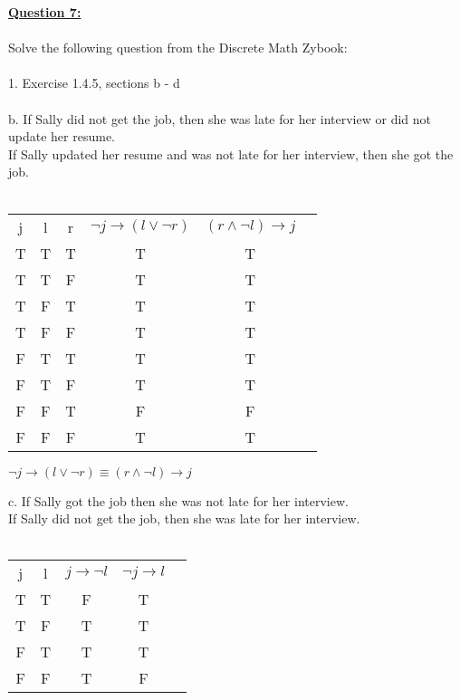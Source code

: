 \documentclass[11pt]{article}
\begin{document}
{\noindent \textbf{\ul{Question 7:}} \\
\\
Solve the following question from the Discrete Math Zybook:\\\\
1. Exercise 1.4.5, sections b - d \\\\
b. If Sally did not get the job, then she was late for her interview or did not update her resume.\\
If Sally updated her resume and was not late for her interview, then she got the job.\\\\

\begin{center}
 
\begin{tabular}{ |c|c|c|c|c|c| } 
 \hline
 j & l & r & $ { \displaystyle \neg } j \rightarrow ( l \vee { \displaystyle \neg } r) $ & $(r \wedge { \displaystyle \neg } l) \rightarrow j$\\ 
 T & T & T & T & T \\ 
 T & T & F & T & T\\ 
 T & F & T & T & T \\ 
 T & F & F & T & T \\
 F & T & T & T & T \\ 
 F & T & F & T & T\\ 
 F & F & T & F & F \\ 
 F & F & F & T & T \\
 \hline
\end{tabular}

\end{center} 
\begin{center}
$ { \displaystyle \neg } j \rightarrow ( l \vee { \displaystyle \neg } r) \equiv (r \wedge { \displaystyle \neg } l) \rightarrow j$
\end{center}

\noindent c. If Sally got the job then she was not late for her interview.\\
If Sally did not get the job, then she was late for her interview.\\\\
\begin{center}
 
\begin{tabular}{ |c|c|c|c|c|} 
 \hline
 j & l & $ j \rightarrow { \displaystyle \neg } l $ & $ { \displaystyle \neg } j \rightarrow l $ \\ 
 T & T & F & T \\ 
 T & F & T & T\\ 
 F & T & T & T \\ 
 F & F & T & F \\


\end{tabular}
\end{center}}
\end{document}
